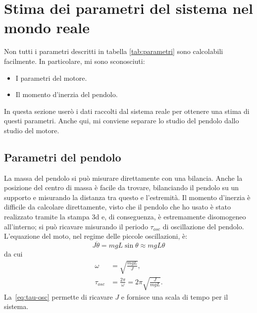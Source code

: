 \section{Stima dei parametri del sistema nel mondo reale}
Non tutti i parametri descritti in tabella \ref{tab:parametri} sono calcolabili facilmente. In particolare, mi sono sconosciuti:
\begin{itemize}
    \item I parametri del motore.
    \item Il momento d'inerzia del pendolo.
\end{itemize}
In questa sezione userò i dati raccolti dal sistema reale per ottenere una stima di questi parametri.
Anche qui, mi conviene separare lo studio del pendolo dallo studio del motore.

\subsection{Parametri del pendolo}
La massa del pendolo si può misurare direttamente con una bilancia.
Anche la posizione del centro di massa è facile da trovare, bilanciando
il pendolo su un supporto e misurando la distanza tra questo e l'estremità.
Il momento d'inerzia è difficile da calcolare direttamente, visto che il
pendolo che ho usato è stato realizzato tramite la stampa 3d e, di conseguenza,
è estremamente disomogeneo all'interno; si può ricavare misurando
il periodo $\tau_{osc}$ di oscillazione del pendolo.
L'equazione del moto, nel regime delle piccole oscillazioni, è:
\begin{equation*}
    J \ddot \theta = mgL \sin \theta \approx mgL \theta
\end{equation*}
da cui
\begin{align}
    \omega &= \sqrt{\frac {m g L} J},\\
    \tau_{osc} &= \frac{2\pi}\omega = 2\pi \sqrt{\frac J {mgL}}.
    \label{eq:tau-osc}
\end{align}
La~\eqref{eq:tau-osc} permette di ricavare $J$ e fornisce una scala
di tempo per il sistema.


